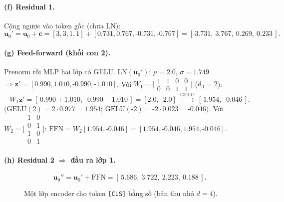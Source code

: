 \documentclass[11pt]{article}
\newcommand{\code}[1]{\textcolor{cInk}{\texttt{#1}}}
\theoremstyle{definition}
\begin{document}
\paragraph{(f) Residual 1.} Cộng ngược vào token gốc (chưa LN):
\[
\mathbf{u}_0'=\mathbf{u}_0+\mathbf{c}=[3,3,1,1]+[0.731,0.767,\text{-}0.731,\text{-}0.767]
=[\,3.731,\ 3.767,\ 0.269,\ 0.233\,].
\]

\paragraph{(g) Feed-forward (khối con 2).} Prenorm rồi MLP hai lớp có GELU.
LN$(\mathbf{u}_0')$: $\mu=2.0$, $\sigma=1.749$ $\Rightarrow
\mathbf{z}'=[0.990,1.010,\text{-}0.990,\text{-}1.010]$. Với
$W_1=\big[\begin{smallmatrix}1&1&0&0\\0&0&1&1\end{smallmatrix}\big]$ ($d_{\text{ff}}{=}2$):
\[
W_1\mathbf{z}'=[\,0.990{+}1.010,\ \text{-}0.990{-}1.010\,]=[2.0,\,\text{-}2.0]
\ \xrightarrow{\text{GELU}}\ [\,1.954,\ \text{-}0.046\,].
\]
$\big(\mathrm{GELU}(2){=}2{\cdot}0.977{=}1.954;\ \mathrm{GELU}(\text{-}2){=}\text{-}2{\cdot}0.023{=}\text{-}0.046\big)$.
Với $W_2=\big[\begin{smallmatrix}1&0\\0&1\\1&0\\0&1\end{smallmatrix}\big]$:
$\mathrm{FFN}=W_2[1.954,\text{-}0.046]=[1.954,\text{-}0.046,1.954,\text{-}0.046]$.

\paragraph{(h) Residual 2 $\Rightarrow$ đầu ra lớp 1.}
\[
\mathbf{u}_0''=\mathbf{u}_0'+\mathrm{FFN}=[\,5.686,\ 3.722,\ 2.223,\ 0.188\,].
\]

\begin{figure}[H]\centering
{}
\caption{Một lớp encoder cho token \code{[CLS]} bằng số (bản thu nhỏ $d{=}4$).}
\end{figure}
\end{document}
